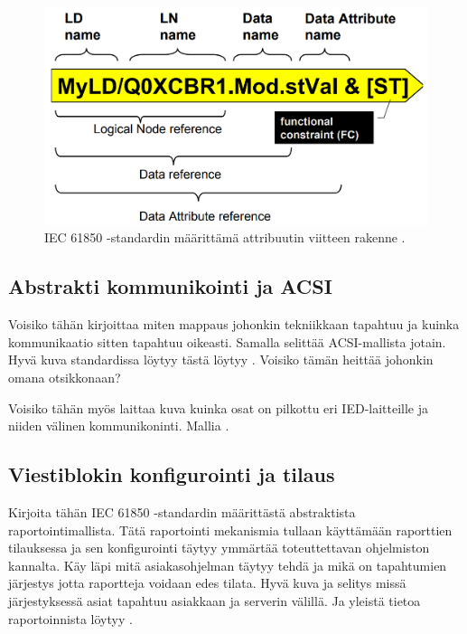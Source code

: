 \begin{figure}
	\includegraphics[width=1\textwidth]{pictures/iec61850-data-reference.png}
	\caption{IEC 61850 -standardin määrittämä attribuutin viitteen rakenne \cite[s.~93]{IEC61850-7-1}.}
	\label{fig:iec61850-data-reference}
\end{figure}



\subsection{Abstrakti kommunikointi ja ACSI}
\begin{it}
	Voisiko tähän kirjoittaa miten mappaus johonkin tekniikkaan tapahtuu ja kuinka kommunikaatio sitten tapahtuu oikeasti. Samalla selittää ACSI-mallista jotain. Hyvä kuva standardissa löytyy tästä löytyy \cite[s.~76]{IEC61850-7-1}. Voisiko tämän heittää johonkin omana otsikkonaan?
	
	Voisiko tähän myös laittaa kuva kuinka osat on pilkottu eri IED-laitteille ja niiden välinen kommunikoninti. Mallia \cite[s.~31]{IEC61850-7-1}.
\end{it}


\subsection{Viestiblokin konfigurointi ja tilaus}
\begin{it}
	Kirjoita tähän IEC 61850 -standardin määrittästä abstraktista raportointimallista. Tätä raportointi mekanismia tullaan käyttämään raporttien tilauksessa ja sen konfigurointi täytyy ymmärtää toteuttettavan ohjelmiston kannalta. Käy läpi mitä asiakasohjelman täytyy tehdä ja mikä on tapahtumien järjestys jotta raportteja voidaan edes tilata.
	Hyvä kuva ja selitys missä järjestyksessä asiat tapahtuu asiakkaan ja serverin välillä. Ja yleistä tietoa raportoinnista löytyy \cite[s.~40--44]{IEC61850-7-1}.
\end{it}


